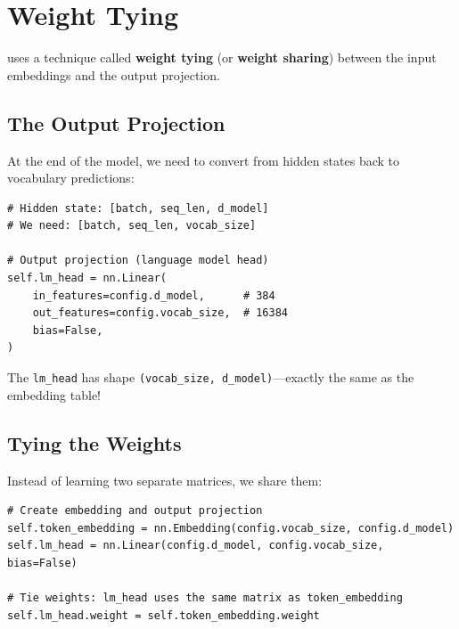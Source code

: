 \section{Weight Tying}

\TryLM uses a technique called \textbf{weight tying} (or \textbf{weight sharing}) between the input embeddings and the output projection.

\subsection{The Output Projection}

At the end of the model, we need to convert from hidden states back to vocabulary predictions:

\begin{lstlisting}[style=python]
# Hidden state: [batch, seq_len, d_model]
# We need: [batch, seq_len, vocab_size]

# Output projection (language model head)
self.lm_head = nn.Linear(
    in_features=config.d_model,      # 384
    out_features=config.vocab_size,  # 16384
    bias=False,
)
\end{lstlisting}

The \texttt{lm\_head} has shape \texttt{(vocab\_size, d\_model)}---exactly the same as the embedding table!

\subsection{Tying the Weights}

Instead of learning two separate matrices, we share them:

\begin{lstlisting}[style=python, caption={Weight tying from model.py}]
# Create embedding and output projection
self.token_embedding = nn.Embedding(config.vocab_size, config.d_model)
self.lm_head = nn.Linear(config.d_model, config.vocab_size, bias=False)

# Tie weights: lm_head uses the same matrix as token_embedding
self.lm_head.weight = self.token_embedding.weight
\end{lstlisting}

